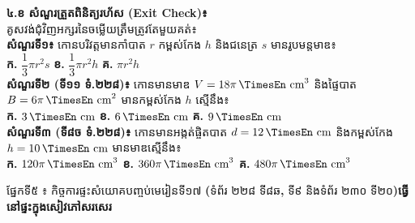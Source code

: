 \documentclass[a4paper,10pt]{article}
\newcommand{\en}[1]{{\TimesEn #1}}
\newcommand{\enbf}[1]{{\TimesEn\textbf{#1}}}
\newcommand{\unit}[1]{\,\text{\en{#1}}}
\newcommand{\secbar}[2]{%
  \vspace{3pt}%
  \begin{tcolorbox}[
    enhanced, sharp corners, colback=headgray, colframe=black,
    boxrule=0.9pt, boxsep=1pt, top=2.5pt, bottom=2.5pt, left=6pt, right=6pt,
    after skip=3pt
  ]
    {\muol\fontsize{9.2pt}{13.5pt}\selectfont #1}\hfill{\fontsize{8.3pt}{11.5pt}\selectfont\textbf{#2}}
  \end{tcolorbox}%
}
\begin{document}
\begin{minipage}[t]{8.7cm}\vspace{0pt}
  \begin{tcolorbox}[
    enhanced, sharp corners, colback=white, colframe=black, equal height group=rowE5,
    boxrule=0.85pt, boxsep=3.5pt, top=7.5pt, bottom=7.5pt, left=5.5pt, right=5.5pt
  ]\raggedright
    \textbf{៤.ខ សំណួរត្រួតពិនិត្យរហ័ស (\en{Exit Check})៖}\\
    គូសវង់ជុំវិញអក្សរនៃចម្លើយត្រឹមត្រូវតែមួយគត់៖\\[6pt]
    \textbf{សំណួរទី១៖} កោនបរិវត្តមានកាំបាត $r$ កម្ពស់កែង $h$ និងជនេត្រ $s$ មានរូបមន្តមាឌ៖\\[2.5pt]
    \hspace*{0.15cm}\textbf{ក.} $\dfrac{1}{3}\pi r^2 s$ \hspace{0.55cm} \textbf{ខ.} $\dfrac{1}{3}\pi r^2 h$ \hspace{0.55cm} \textbf{គ.} $\pi r^2 h$\\[6.5pt]
    \textbf{សំណួរទី២ (ទី១១ ទំ.២២៨)៖} កោនមានមាឌ $V = 18\pi\unit{cm}^3$ និងផ្ទៃបាត $B = 6\pi\unit{cm}^2$ មានកម្ពស់កែង $h$ ស្មើនឹង៖\\[2.5pt]
    \hspace*{0.15cm}\textbf{ក.} $3\unit{cm}$ \hspace{0.65cm} \textbf{ខ.} $6\unit{cm}$ \hspace{0.65cm} \textbf{គ.} $9\unit{cm}$\\[6.5pt]
    \textbf{សំណួរទី៣ (ទី៨ច ទំ.២២៨)៖} កោនមានអង្កត់ផ្ចិតបាត $d = 12\unit{cm}$ និងកម្ពស់កែង $h = 10\unit{cm}$ មានមាឌស្មើនឹង៖\\[2.5pt]
    \hspace*{0.15cm}\textbf{ក.} $120\pi\unit{cm}^3$ \hspace{0.35cm} \textbf{ខ.} $360\pi\unit{cm}^3$ \hspace{0.35cm} \textbf{គ.} $480\pi\unit{cm}^3$
  \end{tcolorbox}
\end{minipage}

\vspace{14pt}
\secbar{ផ្នែកទី៥ ៖ កិច្ចការផ្ទះសំយោគបញ្ចប់មេរៀនទី១៧ \enbf{(}ទំព័រ ២២៨ ទី៨ឆ\enbf{,} ទី៩ និងទំព័រ ២៣០ ទី២០\enbf{)}}{ធ្វើនៅផ្ទះក្នុងសៀវភៅសរសេរ}
\end{document}
